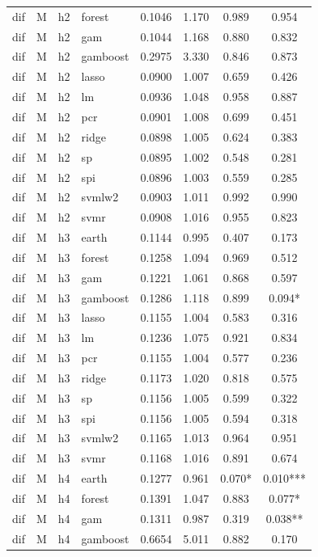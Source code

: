 \begin{ThreePartTable}
\begin{longtable}[t]{llclcccc}
dif & M & h2 & forest & 0.1046 & 1.170 & 0.989 & 0.954\\
dif & M & h2 & gam & 0.1044 & 1.168 & 0.880 & 0.832\\
dif & M & h2 & gamboost & 0.2975 & 3.330 & 0.846 & 0.873\\
dif & M & h2 & lasso & 0.0900 & 1.007 & 0.659 & 0.426\\
dif & M & h2 & lm & 0.0936 & 1.048 & 0.958 & 0.887\\
dif & M & h2 & pcr & 0.0901 & 1.008 & 0.699 & 0.451\\
dif & M & h2 & ridge & 0.0898 & 1.005 & 0.624 & 0.383\\
dif & M & h2 & sp & 0.0895 & 1.002 & 0.548 & 0.281\\
dif & M & h2 & spi & 0.0896 & 1.003 & 0.559 & 0.285\\
dif & M & h2 & svmlw2 & 0.0903 & 1.011 & 0.992 & 0.990\\
dif & M & h2 & svmr & 0.0908 & 1.016 & 0.955 & 0.823\\
\addlinespace
dif & M & h3 & earth & 0.1144 & 0.995 & 0.407 & 0.173\\
dif & M & h3 & forest & 0.1258 & 1.094 & 0.969 & 0.512\\
dif & M & h3 & gam & 0.1221 & 1.061 & 0.868 & 0.597\\
dif & M & h3 & gamboost & 0.1286 & 1.118 & 0.899 & 0.094*\\
dif & M & h3 & lasso & 0.1155 & 1.004 & 0.583 & 0.316\\
dif & M & h3 & lm & 0.1236 & 1.075 & 0.921 & 0.834\\
dif & M & h3 & pcr & 0.1155 & 1.004 & 0.577 & 0.236\\
dif & M & h3 & ridge & 0.1173 & 1.020 & 0.818 & 0.575\\
dif & M & h3 & sp & 0.1156 & 1.005 & 0.599 & 0.322\\
dif & M & h3 & spi & 0.1156 & 1.005 & 0.594 & 0.318\\
dif & M & h3 & svmlw2 & 0.1165 & 1.013 & 0.964 & 0.951\\
dif & M & h3 & svmr & 0.1168 & 1.016 & 0.891 & 0.674\\
\addlinespace
dif & M & h4 & earth & 0.1277 & 0.961 & 0.070* & 0.010***\\
dif & M & h4 & forest & 0.1391 & 1.047 & 0.883 & 0.077*\\
dif & M & h4 & gam & 0.1311 & 0.987 & 0.319 & 0.038**\\
dif & M & h4 & gamboost & 0.6654 & 5.011 & 0.882 & 0.170\\

\end{longtable}
\end{ThreePartTable}
